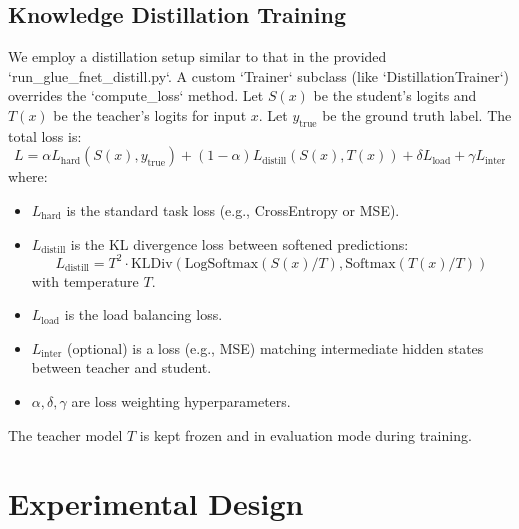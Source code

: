 \documentclass[11pt,a4paper]{article}
\begin{document}
\subsection{Knowledge Distillation Training}
We employ a distillation setup similar to that in the provided `run_glue_fnet_distill.py`. A custom `Trainer` subclass (like `DistillationTrainer`) overrides the `compute_loss` method.
Let $S(x)$ be the student's logits and $T(x)$ be the teacher's logits for input $x$. Let $y_{\text{true}}$ be the ground truth label.
The total loss is:
\begin{equation}
    L = \alpha L_{\text{hard}}(S(x), y_{\text{true}}) + (1 - \alpha) L_{\text{distill}}(S(x), T(x)) + \delta L_{\text{load}} + \gamma L_{\text{inter}}
    \label{eq:total_loss}
\end{equation}
where:
\begin{itemize}
    \item $L_{\text{hard}}$ is the standard task loss (e.g., CrossEntropy or MSE).
    \item $L_{\text{distill}}$ is the KL divergence loss between softened predictions:
    \begin{equation}
        L_{\text{distill}} = T^2 \cdot \text{KLDiv}(\text{LogSoftmax}(S(x)/T), \text{Softmax}(T(x)/T))
        \label{eq:distill_loss}
    \end{equation}
    with temperature $T$.
    \item $L_{\text{load}}$ is the load balancing loss.
    \item $L_{\text{inter}}$ (optional) is a loss (e.g., MSE) matching intermediate hidden states between teacher and student.
    \item $\alpha, \delta, \gamma$ are loss weighting hyperparameters.
\end{itemize}
The teacher model $T$ is kept frozen and in evaluation mode during training.

\section{Experimental Design}
\label{sec:experimental_design}
\end{document}
